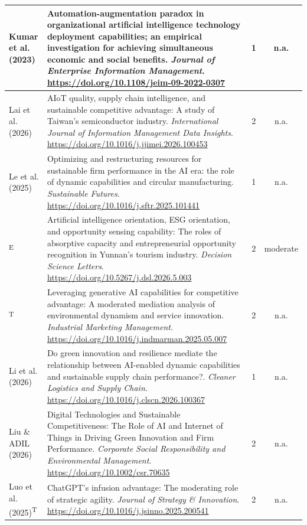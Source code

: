 {\begin{longtable}{|>{\raggedright\arraybackslash}p{2.6cm}|>{\raggedright\arraybackslash}p{10.2cm}|c|c|}
Kumar et al. (2023) & Automation-augmentation paradox in organizational artificial intelligence technology deployment capabilities; an empirical investigation for achieving simultaneous economic and social benefits. \textit{Journal of Enterprise Information Management}. \url{https://doi.org/10.1108/jeim-09-2022-0307} & 1 & n.a. \\ \hline
Lai et al. (2026) & AIoT quality, supply chain intelligence, and sustainable competitive advantage: A study of Taiwan’s semiconductor industry. \textit{International Journal of Information Management Data Insights}. \url{https://doi.org/10.1016/j.jjimei.2026.100453} & 2 & n.a. \\ \hline
Le et al. (2025) & Optimizing and restructuring resources for sustainable firm performance in the AI era: the role of dynamic capabilities and circular manufacturing. \textit{Sustainable Futures}. \url{https://doi.org/10.1016/j.sftr.2025.101441} & 1 & n.a. \\ \hline
\textcite{li2026}\textsuperscript{E} & Artificial intelligence orientation, ESG orientation, and opportunity sensing capability: The roles of absorptive capacity and entrepreneurial opportunity recognition in Yunnan's tourism industry. \textit{Decision Science Letters}. \url{https://doi.org/10.5267/j.dsl.2026.5.003} & 2 & moderate \\ \hline
\textcite{li2025}\textsuperscript{T} & Leveraging generative AI capabilities for competitive advantage: A moderated mediation analysis of environmental dynamism and service innovation. \textit{Industrial Marketing Management}. \url{https://doi.org/10.1016/j.indmarman.2025.05.007} & 2 & n.a. \\ \hline
Li et al. (2026) & Do green innovation and resilience mediate the relationship between AI-enabled dynamic capabilities and sustainable supply chain performance?. \textit{Cleaner Logistics and Supply Chain}. \url{https://doi.org/10.1016/j.clscn.2026.100367} & 1 & n.a. \\ \hline
Liu \& ADIL (2026) & Digital Technologies and Sustainable Competitiveness: The Role of AI and Internet of Things in Driving Green Innovation and Firm Performance. \textit{Corporate Social Responsibility and Environmental Management}. \url{https://doi.org/10.1002/csr.70635} & 2 & n.a. \\ \hline
Luo et al. (2025)\textsuperscript{T} & ChatGPT’s infusion advantage: The moderating role of strategic agility. \textit{Journal of Strategy \& Innovation}. \url{https://doi.org/10.1016/j.jsinno.2025.200541} & 2 & n.a. \\ \hline

\end{longtable}}
